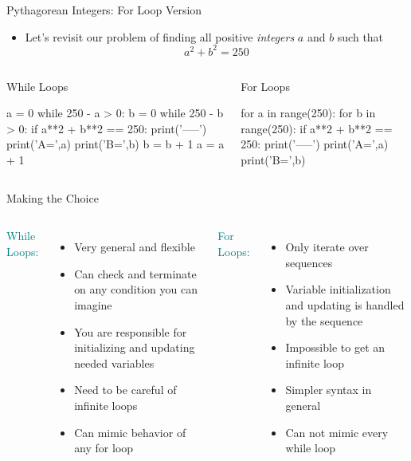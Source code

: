 \documentclass[pdf, aspectratio=169, 12pt]{beamer}
\begin{document}
\begin{frame}[fragile]{Pythagorean Integers: For Loop Version}
	\vspace{5mm}
	\begin{itemize}
		\item Let's revisit our problem of finding all positive \emph{integers} $a$ and $b$ such that
			\[a^2 + b^2 = 250\]
	\end{itemize}
	\vspace{-5mm}
	\begin{columns}[t]
		\begin{block}{While Loops}
			\scriptsize
			\begin{pythoncode}[basicstyle=\color{FG}\ttfamily]
				a = 0
				while 250 - a > 0:
					b = 0
					while 250 - b > 0:
						if a**2 + b**2 == 250:
							print('-----')
							print('A=',a)
							print('B=',b)
						b = b + 1
					a = a + 1
			\end{pythoncode}
		\end{block}
		\begin{block}{For Loops}
			\scriptsize
			\begin{pythoncode}[basicstyle=\color{FG}\ttfamily]
				for a in range(250):
					for b in range(250):
						if a**2 + b**2 == 250:
							print('-----')
							print('A=',a)
							print('B=',b)
			\end{pythoncode}
		\end{block}
	\end{columns}
\end{frame}

\begin{frame}{Making the Choice}
	\begin{columns}
			\textcolor{Teal}{While Loops:}
				\begin{itemize}
					\item Very general and flexible
					\item Can check and terminate on any condition you can imagine
					\item You are responsible for initializing and updating needed variables
					\item Need to be careful of infinite loops
					\item Can mimic behavior of any for loop
				\end{itemize}
			\textcolor{Teal}{For Loops:}
			\begin{itemize}
				\item Only iterate over sequences
				\item Variable initialization and updating is handled by the sequence
				\item Impossible to get an infinite loop
				\item Simpler syntax in general
				\item Can not mimic every while loop
			\end{itemize}
	\end{columns}
\end{frame}
\end{document}
